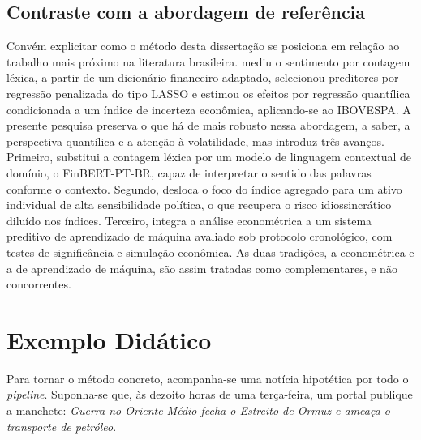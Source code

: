 \subsection{Contraste com a abordagem de referência}

Convém explicitar como o método desta dissertação se posiciona em relação ao trabalho mais próximo na literatura brasileira.  mediu o sentimento por contagem léxica, a partir de um dicionário financeiro adaptado, selecionou preditores por regressão penalizada do tipo LASSO e estimou os efeitos por regressão quantílica condicionada a um índice de incerteza econômica, aplicando-se ao IBOVESPA. A presente pesquisa preserva o que há de mais robusto nessa abordagem, a saber, a perspectiva quantílica e a atenção à volatilidade, mas introduz três avanços. Primeiro, substitui a contagem léxica por um modelo de linguagem contextual de domínio, o FinBERT-PT-BR, capaz de interpretar o sentido das palavras conforme o contexto. Segundo, desloca o foco do índice agregado para um ativo individual de alta sensibilidade política, o que recupera o risco idiossincrático diluído nos índices. Terceiro, integra a análise econométrica a um sistema preditivo de aprendizado de máquina avaliado sob protocolo cronológico, com testes de significância e simulação econômica. As duas tradições, a econométrica e a de aprendizado de máquina, são assim tratadas como complementares, e não concorrentes.

\section{Exemplo Didático}

Para tornar o método concreto, acompanha-se uma notícia hipotética por todo o \textit{pipeline}. Suponha-se que, às dezoito horas de uma terça-feira, um portal publique a manchete: \textit{Guerra no Oriente Médio fecha o Estreito de Ormuz e ameaça o transporte de petróleo}.

